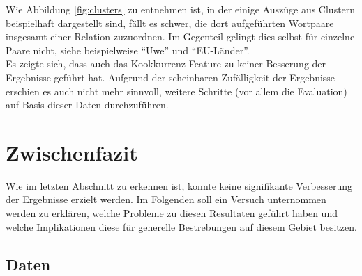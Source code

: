Wie Abbildung \ref{fig:clusters} zu entnehmen ist, in der einige Auszüge aus Clustern beispielhaft dargestellt sind,
fällt es schwer, die dort aufgeführten Wortpaare insgesamt einer Relation zuzuordnen. Im Gegenteil gelingt dies selbst für
einzelne Paare nicht, siehe beispielweise ``Uwe'' und ``EU-Länder''.\\

Es zeigte sich, dass auch das Kookkurrenz-Feature zu keiner Besserung der Ergebnisse geführt hat. Aufgrund der scheinbaren
Zufälligkeit der Ergebnisse erschien es auch nicht mehr sinnvoll, weitere Schritte (vor allem die Evaluation) auf Basis dieser Daten
durchzuführen.\\

\section{Zwischenfazit}\label{sec:zwi-dis}

Wie im letzten Abschnitt zu erkennen ist, konnte keine signifikante Verbesserung der Ergebnisse erzielt werden.
Im Folgenden soll ein Versuch unternommen werden zu erklären, welche Probleme zu diesen Resultaten geführt haben und welche
Implikationen diese für generelle Bestrebungen auf diesem Gebiet besitzen.

\subsection{Daten}\label{sec:zwi-dis-data}

